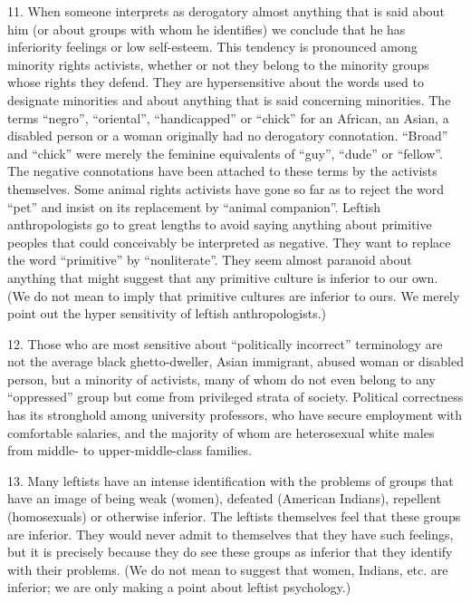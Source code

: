 \documentclass{article}
\begin{document}
11.   When  someone  interprets  as  derogatory  almost  anything  that  is  said  about  him  (or  about  
groups  with  whom  he  identifies)  we  conclude  that  he  has  inferiority  feelings  or  low  self-esteem.  This tendency is pronounced among minority rights activists, whether or not they belong 
to the minority groups whose rights they defend.  They are hypersensitive about the words used to 
designate  minorities  and  about  anything  that  is  said  concerning  minorities.   The  terms  “negro”,  
“oriental”,  “handicapped”  or  “chick”  for  an  African,  an  Asian,  a  disabled  person  or  a  woman  
originally  had  no  derogatory  connotation.  “Broad”  and  “chick”  were  merely  the  feminine  
equivalents of “guy”, “dude” or “fellow”. The negative connotations have been attached to these 
terms by the activists themselves.  Some animal rights activists have gone so far as to reject the 
word  “pet”  and  insist  on  its  replacement  by  “animal  companion”.  Leftish  anthropologists  go  to  
great  lengths  to  avoid  saying  anything  about  primitive  peoples  that  could  conceivably  be  
interpreted as negative.  They want to replace the word “primitive” by “nonliterate”. They seem 
almost  paranoid  about  anything  that  might  suggest  that  any  primitive  culture  is  inferior  to  our  
own.  (We do not mean to imply that primitive cultures are inferior to ours.  We merely point out 
the hyper sensitivity of leftish anthropologists.) \vspace{\baselineskip}

12.  Those  who  are  most  sensitive  about  “politically  incorrect”  terminology  are  not  the  average  
black  ghetto-dweller,  Asian  immigrant,  abused  woman  or  disabled  person,  but  a  minority  of  
activists, many of whom do not even belong to any “oppressed” group but come from privileged 
strata of society.  Political correctness has its stronghold among university professors, who have 
secure employment with comfortable salaries, and the majority of whom are heterosexual white 
males from middle- to upper-middle-class families. \vspace{\baselineskip}

13.  Many leftists have an intense identification with the problems of groups that have an image 
of  being  weak  (women),  defeated  (American  Indians),  repellent  (homosexuals)  or  otherwise  
inferior.  The leftists themselves feel that these  groups are inferior.  They would never admit to 
themselves  that  they  have  such  feelings,  but  it  is  precisely  because  they  do  see  these  groups  as  
inferior that they identify with their problems.  (We do not mean to suggest that women, Indians, 
etc. are inferior; we are only making a point about leftist psychology.) \vspace{\baselineskip}
\end{document}
